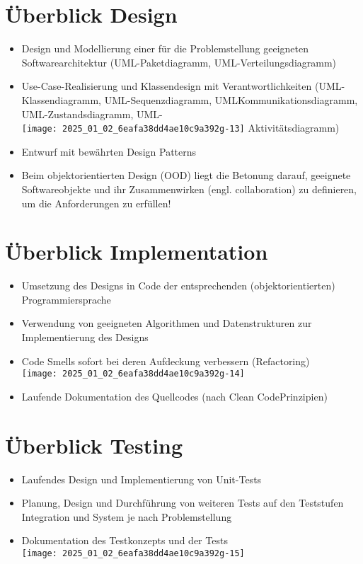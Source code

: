\documentclass[10pt]{article}
\begin{document}
\section*{Überblick Design}
\begin{itemize}
  \item Design und Modellierung einer für die Problemstellung geeigneten Softwarearchitektur (UML-Paketdiagramm, UML-Verteilungsdiagramm)
  \item Use-Case-Realisierung und Klassendesign mit Verantwortlichkeiten (UML-Klassendiagramm, UML-Sequenzdiagramm, UMLKommunikationsdiagramm, UML-Zustandsdiagramm, UML-\\
\texttt{[image: 2025\_01\_02\_6eafa38dd4ae10c9a392g-13]} Aktivitätsdiagramm)
  \item Entwurf mit bewährten Design Patterns
  \item Beim objektorientierten Design (OOD) liegt die Betonung darauf, geeignete Softwareobjekte und ihr Zusammenwirken (engl. collaboration) zu definieren, um die Anforderungen zu erfüllen!
\end{itemize}

\section*{Überblick Implementation}
\begin{itemize}
  \item Umsetzung des Designs in Code der entsprechenden (objektorientierten) Programmiersprache
  \item Verwendung von geeigneten Algorithmen und Datenstrukturen zur Implementierung des Designs
  \item Code Smells sofort bei deren Aufdeckung verbessern (Refactoring)\\
\texttt{[image: 2025\_01\_02\_6eafa38dd4ae10c9a392g-14]}
  \item Laufende Dokumentation des Quellcodes (nach Clean CodePrinzipien)
\end{itemize}

\section*{Überblick Testing}
\begin{itemize}
  \item Laufendes Design und Implementierung von Unit-Tests
  \item Planung, Design und Durchführung von weiteren Tests auf den Teststufen Integration und System je nach Problemstellung
  \item Dokumentation des Testkonzepts und der Tests\\
\texttt{[image: 2025\_01\_02\_6eafa38dd4ae10c9a392g-15]}
\end{itemize}
\end{document}
